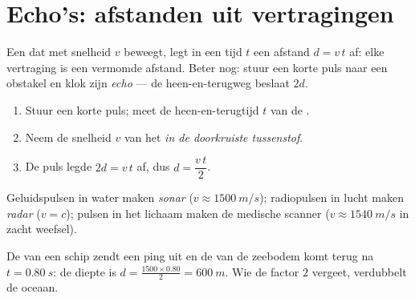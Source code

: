 \section{Echo's: afstanden uit vertragingen}

Een  dat met snelheid $v$ beweegt, legt in een tijd $t$ een
afstand $d = v\,t$ af: elke vertraging is een vermomde afstand. Beter
nog: stuur een korte puls naar een obstakel en klok zijn
\emph{echo} --- de heen-en-terugweg beslaat $2d$.

\begin{method}\label{met:g10:signals-and-waves:echo}
\begin{enumerate}
  \item Stuur een korte puls; meet de heen-en-terugtijd $t$ van de .
  \item Neem de snelheid $v$ van het  \emph{in de doorkruiste
        tussenstof}.
  \item De puls legde $2d = v\,t$ af, dus $d = \dfrac{v\,t}{2}$.
\end{enumerate}
Geluidspulsen in water maken \emph{sonar}
($v \approx \qty{1500}{m/s}$); radiopulsen in lucht maken
\emph{radar} ($v = c$); pulsen  in het lichaam
maken de medische scanner ($v \approx \qty{1540}{m/s}$ in zacht weefsel).
\end{method}

\begin{example}[Sonar]\label{ex:g10:signals-and-waves:sonar}
De  van een schip zendt een ping uit en de  van de zeebodem
komt terug na $t = \qty{0.80}{s}$: de diepte is
$d = \frac{1500 \times 0.80}{2} = \qty{600}{m}$. Wie de factor $2$
vergeet, verdubbelt de oceaan.
\end{example}

